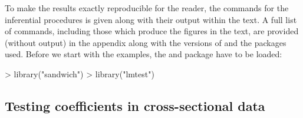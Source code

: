 \documentclass{Z}
\begin{document}
To make the results exactly reproducible for the reader, the commands
for the inferential procedures is given along with their output
within the text. A full list of commands, including
those which produce the figures in the text, are provided (without output) in the
appendix along with the versions of  and the packages used.
Before we start with the examples, the  and  package
have to be loaded:
\begin{Schunk}
\begin{Sinput}
> library("sandwich")
> library("lmtest")
\end{Sinput}
\end{Schunk}

\subsection{Testing coefficients in cross-sectional data}
\end{document}
